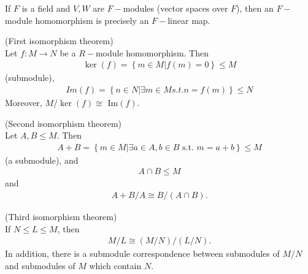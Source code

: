 \documentclass[a4paper]{article}
\begin{document}
\begin{eg}
If $F$ is a field and $V,W$ are $F-$modules (vector spaces over $F$), then an $F-$module homomorphism is precisely an $F-$linear map.
\end{eg}

\begin{thm} (First isomorphism theorem)\\
Let $f:M\to N$ be a $R-$module homomorphism. Then 
\begin{equation*}
\begin{aligned}
\ker\left(f\right) = \left\{m\in M| f\left(m\right)=0\right\} \leq M
\end{aligned}
\end{equation*} 
(submodule), 
\begin{equation*}
\begin{aligned}
Im\left(f\right)=\left\{n\in N| \exists m\in M s.t. n=f\left(m\right)\right\} \leq N
\end{aligned}
\end{equation*}
Moreover, $M/\ker\left(f\right) \cong$ Im$\left(f\right)$.
\end{thm}

\begin{thm} (Second isomorphism theorem)\\
Let $A,B \leq M$. Then\\
\begin{equation*}
\begin{aligned}
A+B=\left\{m\in M|\exists a\in A, b\in B \text{ s.t. } m=a+b\right\} \leq M
\end{aligned}
\end{equation*}
(a submodule), and
\begin{equation*}
\begin{aligned}
A \cap B \leq M
\end{aligned}
\end{equation*}
and
\begin{equation*}
\begin{aligned}
A+B/A \cong B/(A\cap B).
\end{aligned}
\end{equation*}
\end{thm}

\begin{thm} (Third isomorphism theorem)\\
If $N\leq L \leq M$, then
\begin{equation*}
\begin{aligned}
M/L \cong (M/N)/(L/N).
\end{aligned}
\end{equation*}
In addition, there is a submodule correspondence between submodules of $M/N$ and submodules of $M$ which contain $N$.
\end{thm}
\end{document}
